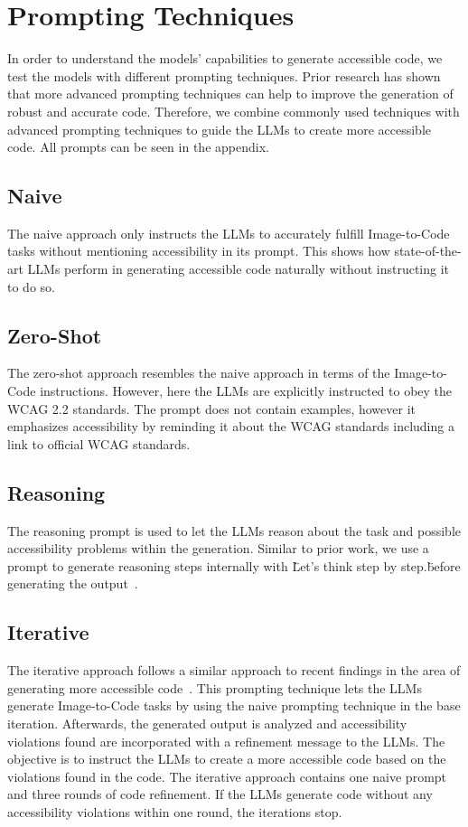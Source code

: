 \section{Prompting Techniques}
In order to understand the models' capabilities to generate accessible code, we test
the models with different prompting techniques. Prior research has shown that more 
advanced prompting techniques can help to improve the generation of robust and 
accurate code. Therefore, we combine commonly used techniques with 
advanced prompting techniques to guide the LLMs to create more accessible code.
All prompts can be seen in the appendix.

\subsection{Naive}
The naive approach only instructs the LLMs to accurately fulfill Image-to-Code tasks
without mentioning accessibility in its prompt. This shows how state-of-the-art 
LLMs perform in generating accessible code naturally without instructing it to 
do so.

\subsection{Zero-Shot}
The zero-shot approach resembles the naive approach in terms of the Image-to-Code
instructions. However, here the LLMs are explicitly instructed to obey the WCAG 
2.2 standards. The prompt does not contain examples, however it emphasizes 
accessibility by reminding it about the WCAG standards including a link to 
official WCAG standards.

\subsection{Reasoning}
The reasoning prompt is used to let the LLMs reason about the task and possible 
accessibility problems within the generation. Similar to prior work, we use 
a prompt to generate reasoning steps internally with \"Let’s think step by 
step.\" before generating the output~\parencite{chae2024thinkexecute}.

\subsection{Iterative}
The iterative approach follows a similar approach to recent findings in the area
of generating more accessible code~\parencite{suh2025accessiblecode}. This 
prompting technique lets the LLMs generate Image-to-Code tasks by using the naive 
prompting technique in the base iteration. Afterwards, the generated output is 
analyzed and accessibility violations found are incorporated with a refinement 
message to the LLMs. The objective is to instruct the LLMs to create a more 
accessible code based on the violations found in the code. The iterative approach 
contains one naive prompt and three rounds of code refinement. If the LLMs 
generate code without any accessibility violations within one round, the 
iterations stop.

